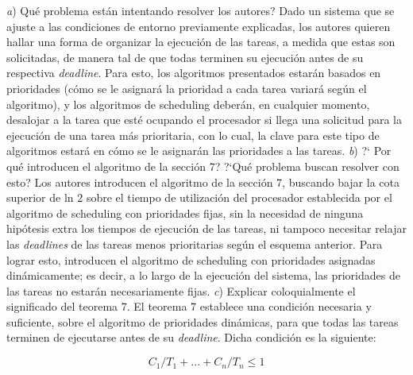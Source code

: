 \newline
\newline
\textit{a}) \textquestiondown Qu\'e problema est\'an intentando resolver los autores?
\newline
\newline
Dado un sistema que se ajuste a las condiciones de entorno previamente explicadas, los autores quieren hallar una forma de organizar la ejecuci\'on de las
tareas, a medida que estas son solicitadas, de manera tal de que todas terminen su ejecuci\'on antes de su respectiva \textit{deadline}. Para esto, los 
algoritmos presentados estar\'an basados en prioridades (c\'omo se le asignar\'a la prioridad a cada tarea variar\'a seg\'un el algoritmo), y los algoritmos
de scheduling deber\'an, en cualquier momento, desalojar a la tarea que est\'e ocupando el procesador si llega una solicitud para la ejecuci\'on de una
tarea m\'as prioritaria, con lo cual, la clave para este tipo de algoritmos estar\'a en c\'omo se le asignar\'an las prioridades a las tareas.
\newline
\newline
\textit{b}) ?` Por qu\'e introducen el algoritmo de la secci\'on 7? ?`Qu\'e problema buscan resolver con esto?
\newline
\newline
Los autores introducen el algoritmo de la secci\'on 7, buscando bajar la cota superior de ln 2 sobre el tiempo de utilizaci\'on del procesador establecida 
por el algoritmo de scheduling con prioridades fijas, sin la necesidad de ninguna hip\'otesis extra los tiempos de ejecuci\'on de las tareas, ni tampoco 
necesitar relajar las \textit{deadlines} de las tareas menos prioritarias seg\'un el esquema anterior. Para lograr esto, introducen el algoritmo de 
scheduling con prioridades asignadas din\'amicamente; es decir, a lo largo de la ejecuci\'on del sistema, las prioridades de las tareas no estar\'an
necesariamente fijas.
\newline
\newline
\textit{c}) Explicar coloquialmente el significado del teorema 7.
\newline
\newline
El teorema 7 establece una condici\'on necesaria y suficiente, sobre el algoritmo de prioridades din\'amicas, para que todas las tareas terminen de ejecutarse
antes de su \textit{deadline}. Dicha condici\'on es la siguiente:

\begin{equation*}
 C_{1}/T_{1} + ... + C_{n}/T_{n} \leq 1
\end{equation*}

